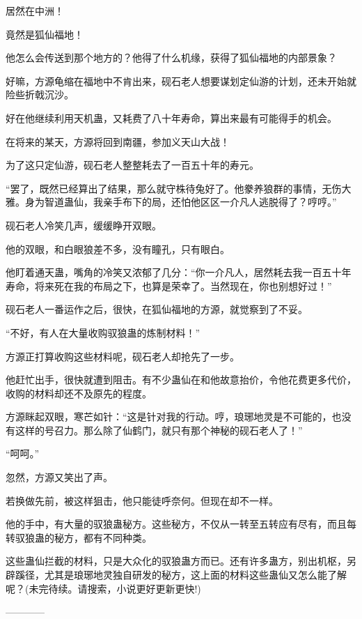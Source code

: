 \begin{this_body}
居然在中洲！

竟然是狐仙福地！

他怎么会传送到那个地方的？他得了什么机缘，获得了狐仙福地的内部景象？

好嘛，方源龟缩在福地中不肯出来，砚石老人想要谋划定仙游的计划，还未开始就险些折戟沉沙。

好在他继续利用天机蛊，又耗费了八十年寿命，算出来最有可能得手的机会。

在将来的某天，方源将回到南疆，参加义天山大战！

为了这只定仙游，砚石老人整整耗去了一百五十年的寿元。

“罢了，既然已经算出了结果，那么就守株待兔好了。他豢养狼群的事情，无伤大雅。身为智道蛊仙，我亲手布下的局，还怕他区区一介凡人逃脱得了？哼哼。”

砚石老人冷笑几声，缓缓睁开双眼。

他的双眼，和白眼狼差不多，没有瞳孔，只有眼白。

他盯着通天蛊，嘴角的冷笑又浓郁了几分：“你一介凡人，居然耗去我一百五十年寿命，将来死在我的布局之下，也算是荣幸了。当然现在，你也别想好过！”

砚石老人一番运作之后，很快，在狐仙福地的方源，就觉察到了不妥。

“不好，有人在大量收购驭狼蛊的炼制材料！”

方源正打算收购这些材料呢，砚石老人却抢先了一步。

他赶忙出手，很快就遭到阻击。有不少蛊仙在和他故意抬价，令他花费更多代价，收购的材料却还不及原先的程度。

方源眯起双眼，寒芒如针：“这是针对我的行动。哼，琅琊地灵是不可能的，也没有这样的号召力。那么除了仙鹤门，就只有那个神秘的砚石老人了！”

“呵呵。”

忽然，方源又笑出了声。

若换做先前，被这样狙击，他只能徒呼奈何。但现在却不一样。

他的手中，有大量的驭狼蛊秘方。这些秘方，不仅从一转至五转应有尽有，而且每转驭狼蛊的秘方，都有不同种类。

这些蛊仙拦截的材料，只是大众化的驭狼蛊方而已。还有许多蛊方，别出机枢，另辟蹊径，尤其是琅琊地灵独自研发的秘方，这上面的材料这些蛊仙又怎么能了解呢？(未完待续。请搜索，小说更好更新更快!)

------------

\end{this_body}

